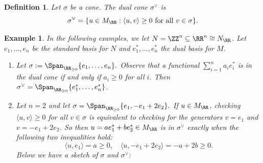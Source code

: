 \documentclass[12pt]{amsart}
\theoremstyle{plain}
\newtheorem{definition}[theorem]{Definition}
\newtheorem{example}[theorem]{Example}
\begin{document}
\begin{definition}
Let $\sigma$ be a cone.
The \emph{dual cone} $\sigma^\vee$ is
$$\sigma^\vee = \{u \in M_\RR : \langle u, v \rangle \ge 0 \text{ for all } v \in \sigma\}.$$
\end{definition}

\begin{example}
In the following examples, we let $N = \ZZ^n \subseteq \RR^n \cong N_\RR$.
Let $e_1, \ldots, e_n$ be the standard basis for $N$ and $e_1^*, \ldots, e_n^*$ the dual basis for $M$.
\begin{enumerate}
\item
Let $\sigma := \Span_{\RR_{\ge 0}}\{e_1, \ldots, e_n\}.$
Observe that a functional $\sum_{i=1}^n a_i e_i^*$ is in the dual cone if and only if $a_i \ge 0$ for all $i$.
Then $\sigma^\vee = \Span_{\RR_{\ge 0}}\{e_1^*, \ldots, e_n^*\}$.

\item
Let $n = 2$ and let $\sigma = \Span_{\RR_{\ge 0}} \{e_1, - e_1 + 2 e_2\}.$
If $u \in M_\RR$, checking $\langle u, v \rangle \ge 0$ for all $v \in \sigma$ is equivalent to checking for the generators $v = e_1$ and $v = -e_1 + 2 e_2$.
So then $u = a e_1^* + b e_2^* \in M_\RR$ is in $\sigma^\vee$ exactly when the following two inequalities hold:
$$\langle u, e_1 \rangle = a \ge 0, \quad \langle u, -e_1 + 2e_2 \rangle = -a + 2b \ge 0.$$
Below we have a sketch of $\sigma$ and $\sigma^\vee$:
\begin{figure}[H]
    \centering
\end{figure}
\end{enumerate}
\end{example}
\end{document}
